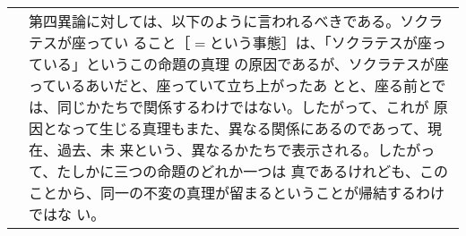 \documentclass[10pt]{jsarticle} %
\begin{document}
\begin{longtable}{p{21em}p{21em}}
&

第四異論に対しては、以下のように言われるべきである。ソクラテスが座ってい
ること［$=$という事態］は、「ソクラテスが座っている」というこの命題の真理
の原因であるが、ソクラテスが座っているあいだと、座っていて立ち上がったあ
とと、座る前とでは、同じかたちで関係するわけではない。したがって、これが
原因となって生じる真理もまた、異なる関係にあるのであって、現在、過去、未
来という、異なるかたちで表示される。したがって、たしかに三つの命題のどれか一つは
真であるけれども、このことから、同一の不変の真理が留まるということが帰結するわけではな
 い。


\end{longtable}
\end{document}
